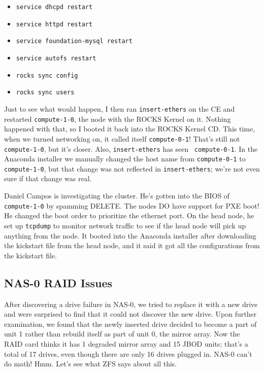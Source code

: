 \documentclass[12pt]{article}
\begin{document}
\begin{itemize}
\item {\tt service dhcpd restart}
\item {\tt service httpd restart}
\item {\tt service foundation-mysql restart}
\item {\tt service autofs restart}
\item {\tt rocks sync config}
\item {\tt rocks sync users}
\end{itemize}

Just to see what would happen, I then ran {\tt insert-ethers} on the CE and
restarted {\tt compute-1-0}, the node with the ROCKS Kernel on it. Nothing
happened with that, so I booted it back into the ROCKS Kernel CD. This time,
when we turned networking on, it called itself {\tt compute-0-1}! That's still
not {\tt compute-1-0}, but it's closer. Also, {\tt insert-ethers} has seen {\tt
  compute-0-1}. In the Anaconda installer we manually changed the host name from
{\tt compute-0-1} to {\tt compute-1-0}, but that change was not reflected in
{\tt insert-ethers}; we're not even sure if that change was real.

\qq Daniel Campos is investigating the cluster. He's gotten into the BIOS of
{\tt compute-1-0} by spamming DELETE. The nodes DO have support for
PXE boot! He changed the boot order to prioritize the ethernet port. On the head
node, he set up {\tt tcpdump} to monitor network traffic to see if the head node
will pick up anything from the node. It booted into the Anaconda installer after
downloading the kickstart file from the head node, and it said it got all the
configurations from the kickstart file. 


\subsection{NAS-0 RAID Issues}

\qq After discovering a drive failure in NAS-0, we tried to replace it with a
new drive and were surprised to find that it could not discover the new
drive. Upon further examination, we found that the newly inserted drive decided
to become a part of unit 1 rather than rebuild itself as part of unit 0, the
mirror array. Now the RAID card thinks it has 1 degraded mirror array and 15
JBOD units; that's a total of 17 drives, even though there are only 16 drives
plugged in. NAS-0 can't do math! Hmm. Let's see what ZFS says about all this.
\end{document}
